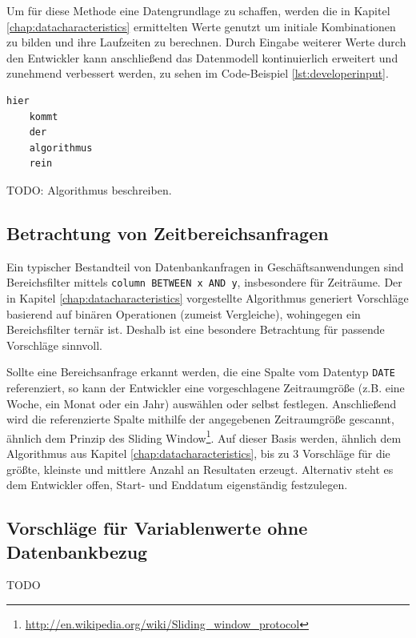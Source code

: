 Um für diese Methode eine Datengrundlage zu schaffen, werden die in Kapitel \ref{chap:datacharacteristics} ermittelten Werte genutzt um initiale Kombinationen zu bilden und ihre Laufzeiten zu berechnen.
Durch Eingabe weiterer Werte durch den Entwickler kann anschließend das Datenmodell kontinuierlich erweitert und zunehmend verbessert werden, zu sehen im Code-Beispiel \ref{lst:developerinput}.

\begin{lstlisting}[caption={Eingaben von Testwert-Konstellationen erweitern gegebenenfalls das Datenmodell}, label={lst:developerinput}, language=Python]
	hier
	kommt
	der
	algorithmus
	rein
\end{lstlisting}

TODO: Algorithmus beschreiben.

\subsection{Betrachtung von Zeitbereichsanfragen}
Ein typischer Bestandteil von Datenbankanfragen in Geschäftsanwendungen sind Bereichsfilter mittels \texttt{column BETWEEN x AND y},  insbesondere für Zeiträume.
Der in Kapitel \ref{chap:datacharacteristics} vorgestellte Algorithmus generiert Vorschläge basierend auf binären Operationen (zumeist Vergleiche), wohingegen ein Bereichsfilter ternär ist.
Deshalb ist eine besondere Betrachtung für passende Vorschläge sinnvoll.

Sollte eine Bereichsanfrage erkannt werden, die eine Spalte vom Datentyp \texttt{DATE} referenziert, so kann der Entwickler eine vorgeschlagene Zeitraumgröße (z.B. eine Woche, ein Monat oder ein Jahr) auswählen oder selbst festlegen.
Anschließend wird die referenzierte Spalte mithilfe der angegebenen Zeitraumgröße gescannt, ähnlich dem Prinzip des Sliding Window\footnote{\url{http://en.wikipedia.org/wiki/Sliding_window_protocol}}.
Auf dieser Basis werden, ähnlich dem Algorithmus aus Kapitel \ref{chap:datacharacteristics}, bis zu 3 Vorschläge für die größte, kleinste und mittlere Anzahl an Resultaten erzeugt.
Alternativ steht es dem Entwickler offen, Start- und Enddatum eigenständig festzulegen.

\subsection{Vorschläge für Variablenwerte ohne Datenbankbezug}

TODO


